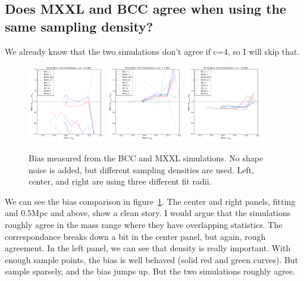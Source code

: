 \documentclass[11pt]{article}
\begin{document}

\subsection{Does MXXL and BCC agree when using the same sampling density?}

We already know that the two simulations don't agree if c=4, so I will skip that.


\begin{figure} \centering
\includegraphics[width=0.3\textwidth]{figures/density_cfree-r1}
\includegraphics[width=0.3\textwidth]{figures/density_cfree-r5}
\includegraphics[width=0.3\textwidth]{figures/density_cfree-r10}
\caption{Bias measured from the BCC and MXXL simulations. No shape noise is added, but different sampling densities are used. Left, center, and right are using three different fit radii.}
\label{fig:bcc_vs_mxxl_density}
\end{figure}

We can see the bias comparison in figure~\ref{fig:bcc_vs_mxxl_density}. The center and right panels, fitting and 0.5Mpc and above, show a clean story. I would argue that the simulations roughly agree in the mass range where they have overlapping statistics. The correspondance breaks down a bit in the center panel, but again, rough agreement. In the left panel, we can see that density is really important. With enough sample points, the bias is well behaved (solid red and green curves). But sample sparsely, and the bias jumps up. But the two simulations roughly agree.
\end{document}
